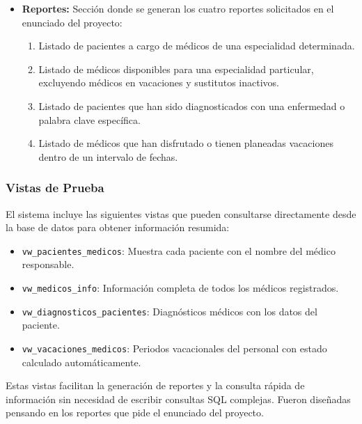 \documentclass[12pt,a4paper]{article}
\begin{document}
\begin{itemize}
    \item \textbf{Reportes:} Secci\'on donde se generan los cuatro reportes solicitados en el enunciado del proyecto:
    \begin{enumerate}
        \item Listado de pacientes a cargo de m\'edicos de una especialidad determinada.
        \item Listado de m\'edicos disponibles para una especialidad particular, excluyendo m\'edicos en vacaciones y sustitutos inactivos.
        \item Listado de pacientes que han sido diagnosticados con una enfermedad o palabra clave espec\'ifica.
        \item Listado de m\'edicos que han disfrutado o tienen planeadas vacaciones dentro de un intervalo de fechas.
    \end{enumerate}
\end{itemize}

\subsubsection{Vistas de Prueba}
El sistema incluye las siguientes vistas que pueden consultarse directamente desde la base de datos para obtener informaci\'on resumida:

\begin{itemize}
    \item \texttt{vw\_pacientes\_medicos}: Muestra cada paciente con el nombre del m\'edico responsable.
    \item \texttt{vw\_medicos\_info}: Informaci\'on completa de todos los m\'edicos registrados.
    \item \texttt{vw\_diagnosticos\_pacientes}: Diagn\'osticos m\'edicos con los datos del paciente.
    \item \texttt{vw\_vacaciones\_medicos}: Periodos vacacionales del personal con estado calculado autom\'aticamente.
\end{itemize}

Estas vistas facilitan la generaci\'on de reportes y la consulta r\'apida de informaci\'on sin necesidad de escribir consultas SQL complejas. Fueron dise\~nadas pensando en los reportes que pide el enunciado del proyecto.

\end{document}
